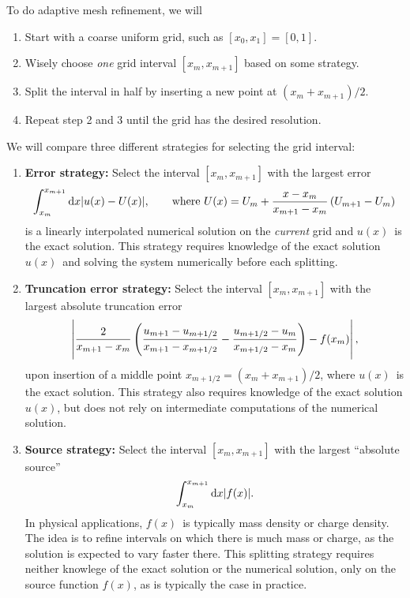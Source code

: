 To do adaptive mesh refinement, we will
\begin{enumerate}
\item Start with a coarse uniform grid, such as $[x_0, x_1] = [0, 1]$.
\item Wisely choose \emph{one} grid interval $[x_m, x_{m+1}]$ based on some strategy.
\item Split the interval in half by inserting a new point at $(x_m + x_{m+1}) / 2$.
\item Repeat step 2 and 3 until the grid has the desired resolution.
\end{enumerate}
We will compare three different strategies for selecting the grid interval:
\begin{enumerate}
\item \textbf{Error strategy:} Select the interval $[x_m, x_{m+1}]$ with the largest error
\begin{equation*}
\int_{x_m}^{x_{m+1}} \dif x |u(x) - U(x)|, \qquad \text{where} \,\, U(x) = U_m + \frac{x - x_m}{x_{m+1} - x_m} \left( U_{m+1} - U_m \right)
\end{equation*}
is a linearly interpolated numerical solution on the \emph{current} grid and $u(x)$ is the exact solution.
This strategy requires knowledge of the exact solution $u(x)$ and solving the system numerically before each splitting.

\item \textbf{Truncation error strategy:} Select the interval $[x_m, x_{m+1}]$ with the largest absolute truncation error
\begin{equation*}
\left| \frac{2}{x_{m+1}-x_{m}} \left( \frac{u_{m+1}-u_{m+1/2}}{x_{m+1}-x_{m+1/2}} - \frac{u_{m+1/2}-u_{m}}{x_{m+1/2}-x_{m}} \right) - f(x_m) \right|,
\end{equation*}
upon insertion of a middle point $x_{m+1/2} = (x_m + x_{m+1})/2$, where $u(x)$ is the exact solution.
This strategy also requires knowledge of the exact solution $u(x)$, but does not rely on intermediate computations of the numerical solution.

\item \textbf{Source strategy:} Select the interval $[x_m, x_{m+1}]$ with the largest ``absolute source''
\begin{equation*}
\int_{x_m}^{x_{m+1}} \dif x |f(x)|.
\end{equation*}
In physical applications, $f(x)$ is typically mass density or charge density. 
The idea is to refine intervals on which there is much mass or charge, as the solution is expected to vary faster there.
This splitting strategy requires neither knowlege of the exact solution or the numerical solution, only on the source function $f(x)$, as is typically the case in practice.
\end{enumerate}


